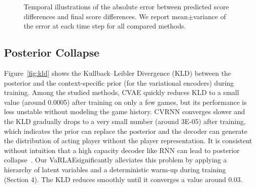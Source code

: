 \documentclass{article}
\newcommand{\system}{VaRLAE\;}
\begin{document}
\begin{figure}[!htbp]
    \caption{Temporal illustrations of the absolute error between predicted score differences and final score differences. We report mean$\pm$variance of the error at each time step for all compared methods.} 
\end{figure}


\subsection{Posterior Collapse}
Figure~\ref{fig:kld} shows the Kullback–Leibler Divergence (KLD) between the posterior and the context-specific prior (for the variational encoders) during training. Among the studied methods, CVAE quickly reduces KLD to a small value (around 0.0005) after training on only a few games, but its performance is less unstable without modeling the game history. CVRNN converges slower and the KLD gradually drops to a very small number (around 3E-05) after training, which indicates the prior can replace the posterior and the decoder can generate the distribution of acting player without the player representation. It is consistent without intuition that a high capacity decoder like RNN can lead to posterior collapse~\cite{ZhuBNVAE2020}. Our \system significantly alleviates this problem by applying a hierarchy of latent variables and a deterministic warm-up during training (Section 4). The KLD reduces smoothly until it converges a value around 0.03.
\end{document}
